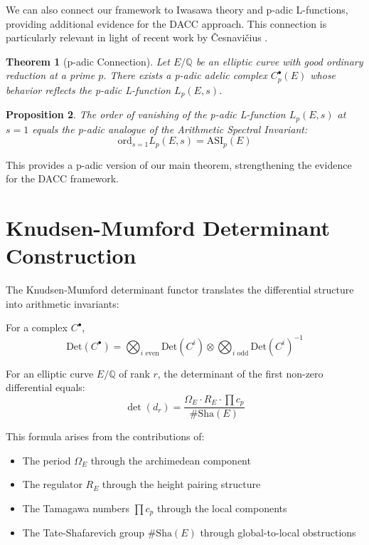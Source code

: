 \documentclass{article}
\theoremstyle{plain}
\newtheorem{theorem}{Theorem}[section]
\newtheorem{proposition}[theorem]{Proposition}
\theoremstyle{definition}
\theoremstyle{remark}
\begin{document}
We can also connect our framework to Iwasawa theory and p-adic L-functions, providing additional evidence for the DACC approach. This connection is particularly relevant in light of recent work by Česnavičius \cite{Cesnavičius2022}.

\begin{theorem}[p-adic Connection]
Let $E/\mathbb{Q}$ be an elliptic curve with good ordinary reduction at a prime $p$. There exists a p-adic adelic complex $C^\bullet_p(E)$ whose behavior reflects the p-adic L-function $L_p(E, s)$.
\end{theorem}

\begin{proposition}
The order of vanishing of the p-adic L-function $L_p(E, s)$ at $s = 1$ equals the p-adic analogue of the Arithmetic Spectral Invariant:
\[
\text{ord}_{s=1}L_p(E, s) = \text{ASI}_p(E)
\]
\end{proposition}

This provides a p-adic version of our main theorem, strengthening the evidence for the DACC framework.

\section{Knudsen-Mumford Determinant Construction}

The Knudsen-Mumford determinant functor translates the differential structure into arithmetic invariants:
\vspace{.3cm} 

For a complex $C^\bullet$, 
\[
\text{Det}(C^\bullet) = \bigotimes_{i \text{ even}} \text{Det}(C^i) \otimes \bigotimes_{i \text{ odd}} \text{Det}(C^i)^{-1}
\]

For an elliptic curve $E/\mathbb{Q}$ of rank $r$, the determinant of the first non-zero differential equals:
\[
\det(d_r) = \frac{\Omega_E \cdot R_E \cdot \prod c_p}{\#\text{Sha}(E)}
\]

This formula arises from the contributions of:
\begin{itemize}
\item The period $\Omega_E$ through the archimedean component
\item The regulator $R_E$ through the height pairing structure
\item The Tamagawa numbers $\prod c_p$ through the local components
\item The Tate-Shafarevich group $\#\text{Sha}(E)$ through global-to-local obstructions
\end{itemize}
\end{document}
